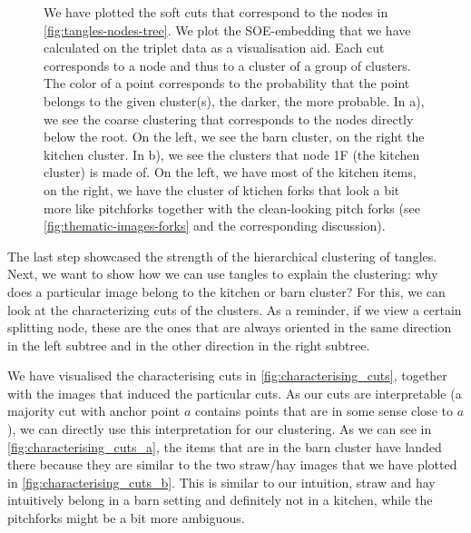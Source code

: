 \onecolumn
\begin{figure}[ht]
    \centering
    \hfill
    \caption{
        We have plotted the soft cuts that correspond to the nodes in \autoref{fig:tangles-nodes-tree}. We plot the SOE-embedding that we
        have calculated on the triplet data as a visualisation aid. Each cut corresponds to a node and thus to a cluster
        of a group of clusters. The color of a point corresponds to the probability that
        the point belongs to the given cluster(s), the darker, the more probable. 
        In a), we see the coarse clustering that corresponds to the nodes directly below the root. On the left, we see the barn cluster, 
        on the right the kitchen cluster. In b), we see the clusters that node 1F (the kitchen cluster) is made of. On the left, we have
        most of the kitchen items, on the right, we have the cluster of ktichen forks that look a bit more like pitchforks together with the clean-looking
        pitch forks (see \autoref{fig:thematic-images-forks} and the corresponding discussion).
    }
    \label{fig:soft-clustering}
\end{figure}

The last step showcased the strength of the hierarchical clustering of tangles. Next, we want to show how we can use tangles to explain the clustering:
why does a particular image belong to the kitchen or barn cluster? For this, we can look at the characterizing cuts of the clusters. As a reminder, if we view a certain splitting node,
these are the ones that are always oriented in the same direction in the left subtree and in the other direction in the right subtree. 

We have visualised the characterising cuts in \autoref{fig:characterising_cuts}, together with the images that induced the particular cuts. As our cuts are interpretable (a majority cut 
with anchor point $a$ contains points that are in some sense close to $a$), we can directly use this interpretation for our clustering. As we can see in \autoref{fig:characterising_cuts_a}, 
the items that are in the barn cluster have landed there because they are similar to the two straw/hay images that we have plotted in \autoref{fig:characterising_cuts_b}. This is similar to our intuition, straw and hay intuitively belong 
in a barn setting and definitely not in a kitchen, while the pitchforks might be a bit more ambiguous.

